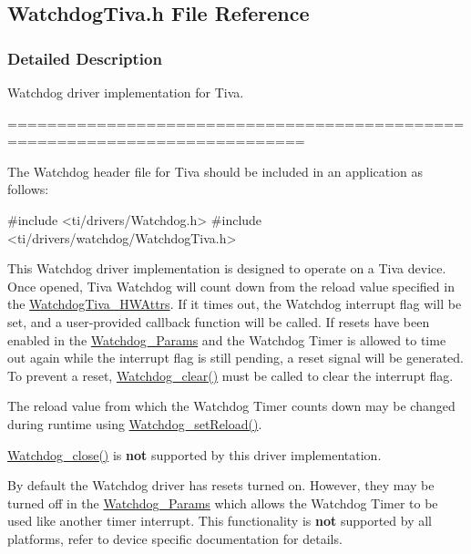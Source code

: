 \subsection{Watchdog\+Tiva.\+h File Reference}
\label{_watchdog_tiva_8h}


\subsubsection{Detailed Description}
Watchdog driver implementation for Tiva. 

============================================================================

The Watchdog header file for Tiva should be included in an application as follows\+: 
\begin{DoxyCode}
\textcolor{preprocessor}{#include <ti/drivers/Watchdog.h>}
\textcolor{preprocessor}{#include <ti/drivers/watchdog/WatchdogTiva.h>}
\end{DoxyCode}


This Watchdog driver implementation is designed to operate on a Tiva device. Once opened, Tiva Watchdog will count down from the reload value specified in the \hyperlink{struct_watchdog_tiva___h_w_attrs}{Watchdog\+Tiva\+\_\+\+H\+W\+Attrs}. If it times out, the Watchdog interrupt flag will be set, and a user-\/provided callback function will be called. If resets have been enabled in the \hyperlink{struct_watchdog___params}{Watchdog\+\_\+\+Params} and the Watchdog Timer is allowed to time out again while the interrupt flag is still pending, a reset signal will be generated. To prevent a reset, \hyperlink{_watchdog_8h_a396decd6b1807db10c636f9987c3be4c}{Watchdog\+\_\+clear()} must be called to clear the interrupt flag.

The reload value from which the Watchdog Timer counts down may be changed during runtime using \hyperlink{_watchdog_8h_a77ec81e1304fe05b77a9976e10e2d9a3}{Watchdog\+\_\+set\+Reload()}.

\hyperlink{_watchdog_8h_a1c0dfea7011b06f303d01afb631ffbdd}{Watchdog\+\_\+close()} is {\bfseries not} supported by this driver implementation.

By default the Watchdog driver has resets turned on. However, they may be turned off in the \hyperlink{struct_watchdog___params}{Watchdog\+\_\+\+Params} which allows the Watchdog Timer to be used like another timer interrupt. This functionality is {\bfseries not} supported by all platforms, refer to device specific documentation for details.

